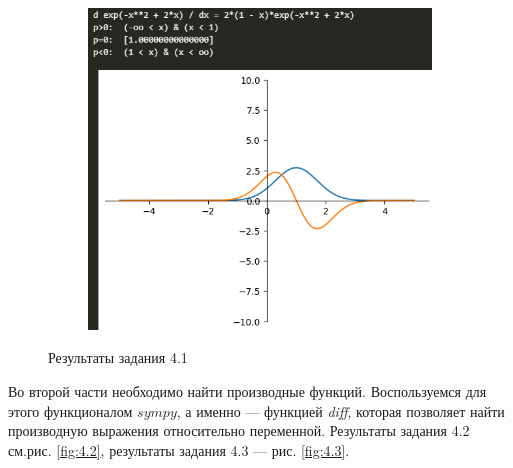 \documentclass[14pt,a4paper]{extarticle}
\begin{document}
\begin{figure}[ht!]
\begin{subfigure}{.333\textwidth}
    \end{subfigure}%
    \begin{subfigure}{.333\textwidth}
        \centering
        \includegraphics[width=\linewidth]{figures/1-3.png}
    \end{subfigure}%
    \caption{Результаты задания 4.1}
    \label{fig:4.1-result}
\end{figure}


Во второй части необходимо найти производные функций. Воспользуемся для этого
функционалом $sympy$, а именно --- функцией \textit{diff}, которая позволяет найти
производную выражения относительно переменной. Результаты задания 4.2 см.рис. \ref{fig:4.2},
результаты задания 4.3 --- рис. \ref{fig:4.3}.
\end{document}
